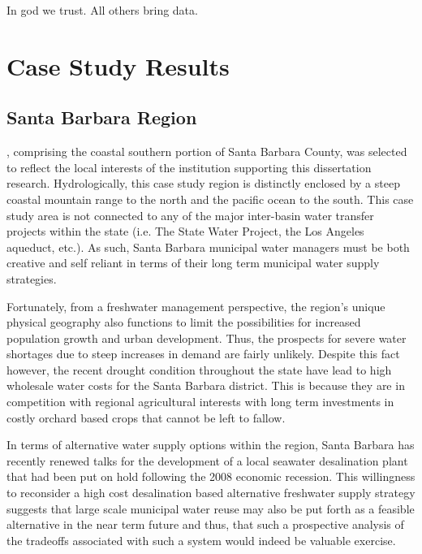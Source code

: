 \begin{savequote}[75mm]
In god we trust. 
All others bring data. 
\end{savequote}

\chapter{Case Study Results}
\label{Chapter 4}

\newpage

\section{Santa Barbara Region}

, comprising the coastal southern portion of Santa Barbara County, was selected to reflect the local interests of the institution supporting this dissertation research. Hydrologically, this case study region is distinctly enclosed by a steep coastal mountain range to the north and the pacific ocean to the south. This case study area is not connected to any of the major inter-basin water transfer projects within the state (i.e. The State Water Project, the Los Angeles aqueduct, etc.). As such, Santa Barbara municipal water managers must be both creative and self reliant in terms of their long term municipal water supply strategies. 

Fortunately, from a freshwater management perspective, the region's unique physical geography also functions to limit the possibilities for increased population growth and urban development. Thus, the prospects for severe water shortages due to steep increases in demand are fairly unlikely. Despite this fact however, the recent drought condition throughout the state have lead to high wholesale water costs for the Santa Barbara district. This is because they are in competition with regional agricultural interests with long term investments in costly orchard based crops that cannot be left to fallow. 

In terms of alternative water supply options within the region, Santa Barbara has recently renewed talks for the development of a local seawater desalination plant that had been put on hold following the 2008 economic recession. This willingness to reconsider a high cost desalination based alternative freshwater supply strategy suggests that large scale municipal water reuse may also be put forth as a feasible alternative in the near term future and thus, that such a prospective analysis of the tradeoffs associated with such a system would indeed be valuable exercise.  

